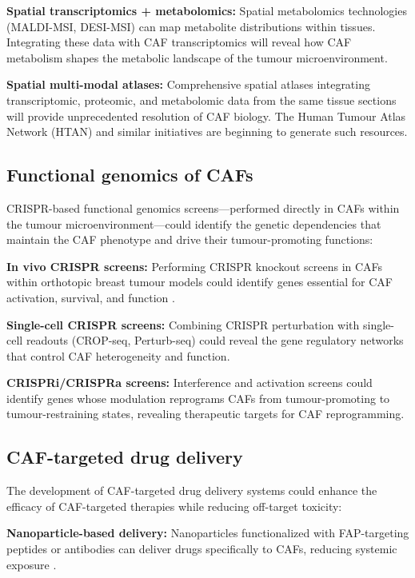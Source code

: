 \textbf{Spatial transcriptomics + metabolomics:} Spatial metabolomics technologies (MALDI-MSI, DESI-MSI) can map metabolite distributions within tissues. Integrating these data with CAF transcriptomics will reveal how CAF metabolism shapes the metabolic landscape of the tumour microenvironment.

\textbf{Spatial multi-modal atlases:} Comprehensive spatial atlases integrating transcriptomic, proteomic, and metabolomic data from the same tissue sections will provide unprecedented resolution of CAF biology. The Human Tumour Atlas Network (HTAN) and similar initiatives are beginning to generate such resources.

\subsection{Functional genomics of CAFs}

CRISPR-based functional genomics screens---performed directly in CAFs within the tumour microenvironment---could identify the genetic dependencies that maintain the CAF phenotype and drive their tumour-promoting functions:

\textbf{In vivo CRISPR screens:} Performing CRISPR knockout screens in CAFs within orthotopic breast tumour models could identify genes essential for CAF activation, survival, and function \citep{erve2024}.

\textbf{Single-cell CRISPR screens:} Combining CRISPR perturbation with single-cell readouts (CROP-seq, Perturb-seq) could reveal the gene regulatory networks that control CAF heterogeneity and function.

\textbf{CRISPRi/CRISPRa screens:} Interference and activation screens could identify genes whose modulation reprograms CAFs from tumour-promoting to tumour-restraining states, revealing therapeutic targets for CAF reprogramming.

\subsection{CAF-targeted drug delivery}

The development of CAF-targeted drug delivery systems could enhance the efficacy of CAF-targeted therapies while reducing off-target toxicity:

\textbf{Nanoparticle-based delivery:} Nanoparticles functionalized with FAP-targeting peptides or antibodies can deliver drugs specifically to CAFs, reducing systemic exposure \citep{miao2023}.

